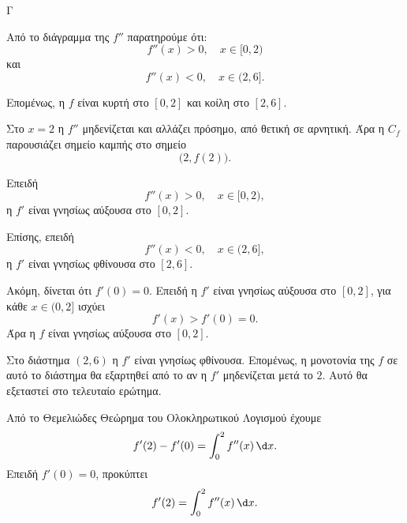\begin{thema}{Γ}

\begin{center}
\end{center}

\begin{erwthma}
\item Από το διάγραμμα της $f''$ παρατηρούμε ότι:
\[
f''(x)>0,\quad x\in[0,2)
\]
και
\[
f''(x)<0,\quad x\in(2,6].
\]

Επομένως, η $f$ είναι κυρτή στο $[0,2]$ και κοίλη στο $[2,6]$.

Στο $x=2$ η $f''$ μηδενίζεται και αλλάζει πρόσημο, από θετική σε αρνητική.
Άρα η $C_f$ παρουσιάζει σημείο καμπής στο σημείο
\[
\bigl(2,f(2)\bigr).
\]

\item Επειδή
\[
f''(x)>0,\quad x\in[0,2),
\]
η $f'$ είναι γνησίως αύξουσα στο $[0,2]$.

Επίσης, επειδή
\[
f''(x)<0,\quad x\in(2,6],
\]
η $f'$ είναι γνησίως φθίνουσα στο $[2,6]$.

Ακόμη, δίνεται ότι $f'(0)=0$. Επειδή η $f'$ είναι γνησίως αύξουσα στο $[0,2]$, για κάθε $x\in(0,2]$ ισχύει
\[
f'(x)>f'(0)=0.
\]
Άρα η $f$ είναι γνησίως αύξουσα στο $[0,2]$.

Στο διάστημα $(2,6)$ η $f'$ είναι γνησίως φθίνουσα. Επομένως, η μονοτονία της $f$ σε αυτό το διάστημα θα εξαρτηθεί από το αν η $f'$ μηδενίζεται μετά το $2$. Αυτό θα εξεταστεί στο τελευταίο ερώτημα.

\item Από το Θεμελιώδες Θεώρημα του Ολοκληρωτικού Λογισμού έχουμε
\[
f'(2)-f'(0)=\int_0^2 f''(x)\,\d x.
\]
Επειδή $f'(0)=0$, προκύπτει
\[
f'(2)=\int_0^2 f''(x)\,\d x.
\]


\end{erwthma}
\end{thema}
